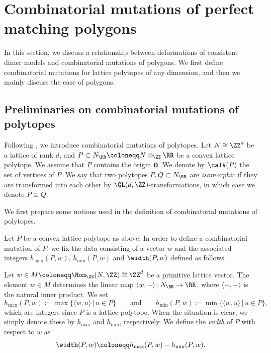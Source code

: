 \section{Combinatorial mutations of perfect matching polygons}\label{sec_mutation_polygon1}
In this section, we discuss a relationship between deformations of consistent dimer models and combinatorial mutations of polygons.
We first define combinatorial mutations for lattice polytopes of any dimension, and then we mainly discuss the case of polygons.

\subsection{Preliminaries on combinatorial mutations of polytopes}\label{sec_pre_mutation_polygon}

Following \cite{ACGK}, we introduce combinatorial mutations of polytopes.
Let $N\cong\ZZ^d$ be a lattice of rank $d$, and $P\subset N_\RR\coloneqq N\otimes_\ZZ\RR$ be a convex lattice polytope.
We assume that $P$ contains the origin ${\bf 0}$.
We denote by $\calV(P)$ the set of vertices of $P$.
We say that two polytopes $P,Q\subset N_\RR$ are \emph{isomorphic} if they are transformed into each other by $\GL(d,\ZZ)$-transformations, in which case we denote $P\cong Q$.

We first prepare some notions used in the definition of combinatorial mutations of polytopes.

\begin{Definition}\label{def_mutation_data}
Let $P$ be a convex lattice polytope as above.
In order to define a combinatorial mutation of $P$, we fix the data consisting of a vector $w$ and the associated integers $h_{\max}(P,w)$,
$h_{\min}(P,w)$ and $\width(P,w)$ defined as follows.

Let $w\in M\coloneqq\Hom_\ZZ(N,\ZZ)\cong\ZZ^d$ be a primitive lattice vector.
The element $w\in M$ determines the linear map $\langle w,-\rangle\colon N_\RR\rightarrow \RR$, where $\langle-,- \rangle$ is the natural inner product.
We set
\begin{displaymath}
h_{\max}(P,w)\coloneqq{\max}\{\langle w,u\rangle \,|\, u\in P\} \qquad\text{and}\qquad
h_{\min}(P,w)\coloneqq{\min}\{\langle w,u\rangle \,|\, u\in P\},
\end{displaymath}
which are integers since $P$ is a lattice polytope.
When the situation is clear, we simply denote these by $h_{\max}$ and $h_{\min}$, respectively.
We define the \emph{width} of $P$ with respect to $w$ as
\begin{displaymath}
\width(P,w)\coloneqq h_{\max}(P,w)-h_{\min}(P,w).
\end{displaymath}
\end{Definition}

